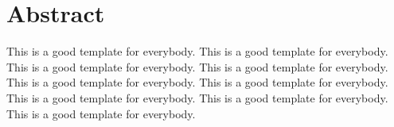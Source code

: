 \chapter*{Abstract}

    This is a good template for everybody.
This is a good template for everybody.
This is a good template for everybody.
This is a good template for everybody.
This is a good template for everybody.
This is a good template for everybody.
This is a good template for everybody.
This is a good template for everybody.
This is a good template for everybody.
